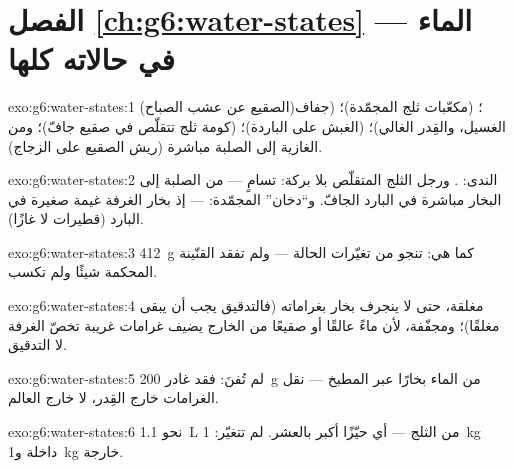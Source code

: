 \section*{الفصل \ref{ch:g6:water-states} --- الماء في حالاته كلها}

\begin{solution}{exo:g6:water-states:1}
 (الصقيع عن عشب الصباح)؛  (مكعّبات ثلج
المجمّدة)؛  (جفاف الغسيل، والقِدر الغالي)؛ 
(الغبش على  الباردة)؛  (كومة ثلج تتقلّص في صقيع
جافّ)؛ ومن الغازية إلى الصلبة مباشرة (ريش الصقيع على الزجاج).
\end{solution}

\begin{solution}{exo:g6:water-states:2}
الندى: . ورجل الثلج المتقلّص بلا بركة: تسامٍ --- من الصلبة
إلى البخار مباشرة في  البارد الجافّ. و``دخان'' المجمّدة:
 --- إذ  بخار الغرفة غيمة صغيرة في  البارد
(قطيرات لا غازًا).
\end{solution}

\begin{solution}{exo:g6:water-states:3}
\qty{412}{g} كما هي:  تنجو من تغيّرات الحالة --- ولم
تفقد القنّينة المحكمة شيئًا ولم تكسب.
\end{solution}

\begin{solution}{exo:g6:water-states:4}
مغلقة، حتى لا ينجرف بخار بغراماته (فالتدقيق يجب أن يبقى
مغلقًا)؛ ومجفّفة، لأن ماءً عالقًا أو صقيعًا من الخارج يضيف
غرامات غريبة تخصّ الغرفة لا التدقيق.
\end{solution}

\begin{solution}{exo:g6:water-states:5}
لم تُفنَ: فقد غادر \qty{200}{g} من الماء بخارًا عبر 
المطبخ ---  نقل الغرامات خارج القِدر، لا خارج العالم.
\end{solution}

\begin{solution}{exo:g6:water-states:6}
نحو \qty{1.1}{L} من الثلج --- أي حيّزًا أكبر بالعشر.  لم
تتغيّر: \qty{1}{kg} داخلة و\qty{1}{kg} خارجة.
\end{solution}

